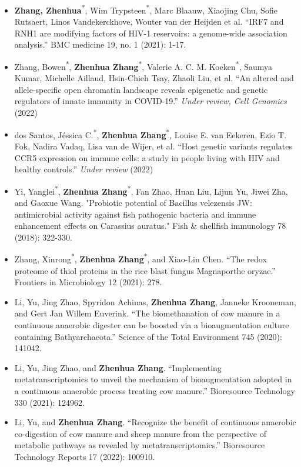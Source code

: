 \documentclass[10pt,A4,english]{article}
\begin{document}
\begin{paracol}{2}
\begin{rightcolumn}
\begin{itemize}[leftmargin=*]
  \item \textbf{Zhang, Zhenhua}\textsuperscript{*}, Wim Trypsteen\textsuperscript{*}, Marc Blaauw, Xiaojing Chu, Sofie Rutsaert, Linos Vandekerckhove, Wouter van der Heijden et al. \enquote{IRF7 and RNH1 are modifying factors of HIV-1 reservoirs: a genome-wide association analysis.} BMC medicine 19, no. 1 (2021): 1-17.
  \item Zhang, Bowen\textsuperscript{*}, \textbf{Zhenhua Zhang}\textsuperscript{*}, Valerie A. C. M. Koeken\textsuperscript{*}, Saumya Kumar, Michelle Aillaud, Hsin-Chieh Tsay, Zhaoli Liu, et al. \enquote{An altered and allele-specific open chromatin landscape reveals epigenetic and genetic regulators of innate immunity in COVID-19.} \textit{Under review, Cell Genomics} (2022)
  \item dos Santos, Jéssica C.\textsuperscript{*}, \textbf{Zhenhua Zhang}\textsuperscript{*}, Louise E. van Eekeren, Ezio T. Fok, Nadira Vadaq, Lisa van de Wijer, et al. \enquote{Host genetic variants regulates CCR5 expression on immune cells: a study in people living with HIV and healthy controls.} \textit{Under review} (2022)
  \item Yi, Yanglei\textsuperscript{*}, \textbf{Zhenhua Zhang}\textsuperscript{*}, Fan Zhao, Huan Liu, Lijun Yu, Jiwei Zha, and Gaoxue Wang. "Probiotic potential of Bacillus velezensis JW: antimicrobial activity against fish pathogenic bacteria and immune enhancement effects on Carassius auratus." Fish \& shellfish immunology 78 (2018): 322-330.
  \item Zhang, Xinrong\textsuperscript{*}, \textbf{Zhenhua Zhang}\textsuperscript{*}, and Xiao-Lin Chen. \enquote{The redox proteome of thiol proteins in the rice blast fungus Magnaporthe oryzae.} Frontiers in Microbiology 12 (2021): 278.
  \item Li, Yu, Jing Zhao, Spyridon Achinas, \textbf{Zhenhua Zhang}, Janneke Krooneman, and Gert Jan Willem Euverink. \enquote{The biomethanation of cow manure in a continuous anaerobic digester can be boosted via a bioaugmentation culture containing Bathyarchaeota.} Science of the Total Environment 745 (2020): 141042.
  \item Li, Yu, Jing Zhao, and \textbf{Zhenhua Zhang}. \enquote{Implementing metatranscriptomics to unveil the mechanism of bioaugmentation adopted in a continuous anaerobic process treating cow manure.} Bioresource Technology 330 (2021): 124962.
  \item Li, Yu, and \textbf{Zhenhua Zhang}. \enquote{Recognize the benefit of continuous anaerobic co-digestion of cow manure and sheep manure from the perspective of metabolic pathways as revealed by metatranscriptomics.} Bioresource Technology Reports 17 (2022): 100910.

\end{itemize}
\end{rightcolumn}
\end{paracol}
\end{document}
